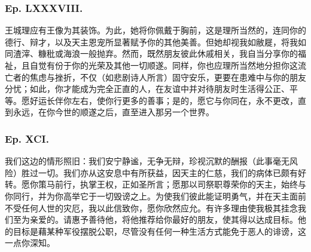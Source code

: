 \par


\subsubsection{Ep. LXXXVIII.}

王城理应有王像为其装饰。为此，她将你佩戴于胸前，这是理所当然的，连同你的德行、辩才，以及天主恩宠所显著赋予你的其他美善。但她却视我如敝屣，将我如同渣滓、糠秕或海浪一般抛弃。然而，既然朋友彼此休戚相关，我自当分享你的福祉，且自觉有份于你的光荣及其他一切顺遂。同样，你也应理所当然地分担你这流亡者的焦虑与挫折，不仅（如悲剧诗人所言）固守安乐，更要在患难中与你的朋友分忧；如此，你才能成为完全正直的人，在友谊中并对待朋友时生活得公正、平等。愿好运长伴你左右，使你行更多的善事；是的，愿它与你同在，永不更改，直到永远，在你今世的顺遂之后，直至进入那另一个世界。\par


\subsubsection{Ep. XCI.}

\par

我们这边的情形照旧：我们安宁静谧，无争无辩，珍视沉默的酬报（此事毫无风险）胜过一切。我们亦从这安息中有所获益，因天主的仁慈，我们的病体已颇有好转。愿你策马前行，执掌王权，正如圣所言；愿那以司祭职尊荣你的天主，始终与你同行，并为你高举它于一切毁谤之上。为使我们彼此能证明勇气，并在天主面前不受任何人世的灾厄，我以此信致你，愿你欣然应允。有许多理由使我极其挂念我们至为亲爱的。请惠予善待他，将他推荐给你最好的朋友，使其得以达成目标。他的目标是藉某种军役摆脱公职，尽管没有任何一种生活方式能免于恶人的诽谤，这一点你深知。\par


